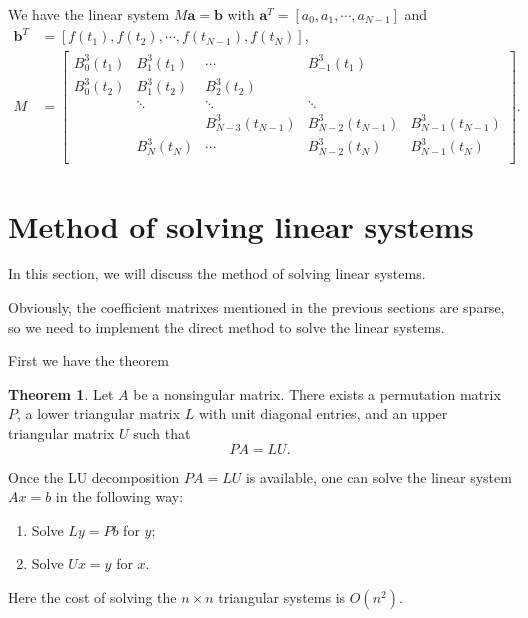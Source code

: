\documentclass[a4paper]{article}
\theoremstyle{definition}
\newtheorem{theorem}{Theorem}
\begin{document}
We have the linear system $M\mathbf{a} = \mathbf{b}$ with $\mathbf{a}^T = [a_0, a_1, \cdots, a_{N - 1}]$ and
\begin{equation}
  \begin{aligned}
    \mathbf{b}^T &= [f(t_1), f(t_2), \cdots, f(t_{N - 1}), f(t_N)], \\
    M &= \begin{bmatrix}
      B_0^3(t_1) & B_1^3(t_1) &  \cdots  &  B_{-1}^3(t_1) &  \\
      B_0^3(t_2) & B_1^3(t_2) & B_2^3(t_2) &    &    \\
        &  \ddots &  \ddots & \ddots &    \\
        &    & B_{N - 3}^3(t_{N - 1}) & B_{N - 2}^3(t_{N - 1}) & B_{N - 1}^3(t_{N - 1}) \\
        & B_N^3(t_N) & \cdots &  B_{N - 2}^3(t_N) & B_{N - 1}^3(t_N) \\
    \end{bmatrix}.
  \end{aligned}
  \label{eq:periodic-cubic-b-spline-linear-system}
\end{equation}

\section{Method of solving linear systems}

In this section, we will discuss the method of solving linear systems. 

Obviously, the coefficient matrixes mentioned in the previous sections are sparse, so we need to implement the direct method to solve the linear systems. 

First we have the theorem 
\begin{theorem}
  Let $A$ be a nonsingular matrix. There exists a permutation matrix $P$, a lower triangular matrix $L$ with unit diagonal entries, and an upper triangular matrix $U$ such that 
  \begin{equation}
    PA = LU.
    \label{eq:lu-decomposition}
  \end{equation}
\end{theorem}

Once the LU decomposition $PA = LU$ is available, one can solve the linear system $Ax = b$ in the following way:
\begin{enumerate}
  \item Solve $Ly = Pb$ for $y$;
  \item Solve $Ux = y$ for $x$.
\end{enumerate}
Here the cost of solving the $n \times n$ triangular systems is $O(n^2)$. 
\end{document}
